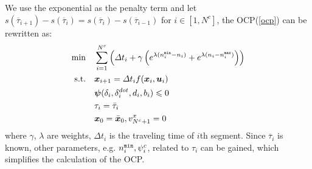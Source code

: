 \documentclass[conference, onecolumn]{IEEEtran}
\begin{document}
We use the exponential as the penalty term and let $s(\overline{\tau}_{i+1})-s(\overline{\tau}_{i})=s(\overline{\tau}_{i})-s(\overline{\tau}_{i-1})$ for $i \in [1,N^c]$, the OCP(\ref{ocp}) can be rewritten as:
\begin{subequations}
	\begin{align}
		\min \quad & \sum_{i = 1}^{N^{c}}\left(\varDelta t_i + \gamma\left(e^{\lambda(n^{\tt min}_i-n_i) }+e^{\lambda(n_i-n^{\tt max}_i) }\right)\right)\\
		\textrm{s.t.} \quad & \boldsymbol{x}_{i+1}=\varDelta t_i f(\boldsymbol{x}_i,\boldsymbol{u}_i)\\
		\quad &  \boldsymbol{\psi}(\delta_i,\delta^{dot}_i,d_i,b_i)\leqslant 0 \\
		\quad & \tau_i=\bar{\tau}_i \\
		\quad & \boldsymbol{x}_0=\bar{\boldsymbol{x}}_0,v^x_{N^c+1}=0
		\label{ocp_refine}
	\end{align}
\end{subequations}
where $\gamma$, $\lambda$ are weights, $\varDelta t_i$ is the traveling time of $i$th segment. Since $\overline{\tau}_{i}$ is known, other parameters, e.g. $n^{\tt min}_i,\psi^c_i$, related to $\tau_{i}$ can be gained, which simplifies the calculation of the OCP. 
\end{document}
